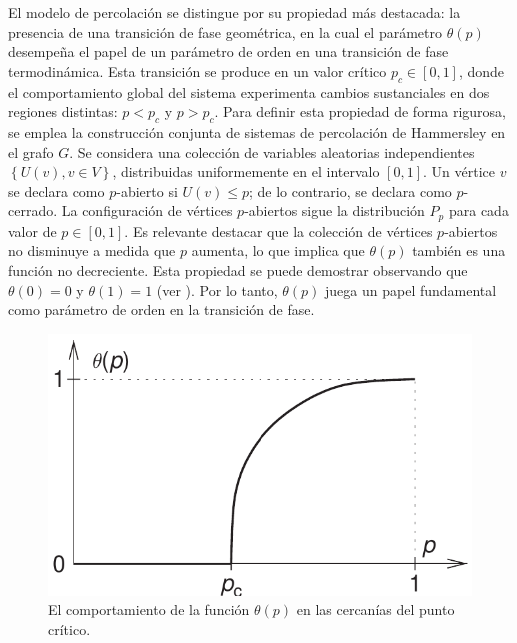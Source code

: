 El modelo de percolación se distingue por su propiedad más destacada: la presencia de una transición de fase geométrica, en la cual el parámetro $\theta(p)$ desempeña el papel de un parámetro de orden en una transición de fase termodinámica. Esta transición se produce en un valor crítico $p_c \in  [0 , 1]$, donde el comportamiento global del sistema experimenta cambios sustanciales en dos regiones distintas: $p < p_c$ y $p > p_c$.  Para definir esta propiedad de forma rigurosa, se emplea la construcción conjunta de sistemas de percolación de Hammersley \cite{broadbent_percolation_1957}  en el grafo $G$. Se considera una colección de variables aleatorias independientes $\left\{U(v),v\in V\right\}$, distribuidas uniformemente en el intervalo $[0,1]$. Un vértice $v$ se declara como $p$-abierto si $U(v) \leq p$; de lo contrario, se declara como $p$-cerrado. La configuración de vértices $p$-abiertos sigue la distribución $P_p$ para cada valor de $p\in [0, 1]$. Es relevante destacar que la colección de vértices $p$-abiertos no disminuye a medida que $p$ aumenta, lo que implica que $\theta(p)$ también es una función no decreciente. Esta propiedad se puede demostrar observando que $\theta(0) = 0$ y $\theta(1) = 1$  (ver ). Por lo tanto, $\theta(p)$  juega un papel fundamental como parámetro de orden en la transición de fase.



\begin{figure}[h!]
	\centering\includegraphics[width=\imsize]{probabilidadtheta.png}
	\caption[El comportamiento de la función $\theta(p)$ en las cercanías del punto crítico.]{El comportamiento de la función $\theta(p)$ en las cercanías del punto crítico.}\label{fig:probabilidadtheta}
\end{figure}


